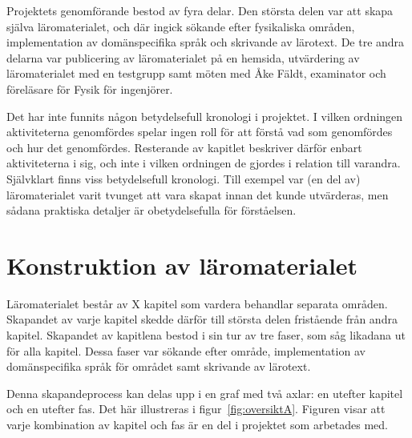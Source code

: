 \begin{draft}

Projektets genomförande bestod av fyra delar. Den största delen var att skapa själva läromaterialet, och där ingick sökande efter fysikaliska områden, implementation av domänspecifika språk och skrivande av lärotext. De tre andra delarna var publicering av läromaterialet på en hemsida, utvärdering av läromaterialet med en testgrupp samt möten med Åke Fäldt, examinator och föreläsare för Fysik för ingenjörer.

Det har inte funnits någon betydelsefull kronologi i projektet. I vilken ordningen aktiviteterna genomfördes spelar ingen roll för att förstå vad som genomfördes och hur det genomfördes. Resterande av kapitlet beskriver därför enbart aktiviteterna i sig, och inte i vilken ordningen de gjordes i relation till varandra. Självklart finns viss betydelsefull kronologi. Till exempel var (en del av) läromaterialet varit tvunget att vara skapat innan det kunde utvärderas, men sådana praktiska detaljer är obetydelsefulla för förståelsen.

\section{Konstruktion av läromaterialet}

Läromaterialet består av X kapitel som vardera behandlar separata
områden. Skapandet av varje kapitel skedde därför till största delen fristående
från andra kapitel. Skapandet av kapitlena bestod i sin tur av tre faser,
som såg likadana ut för alla kapitel. Dessa faser var sökande efter område,
implementation av domänspecifika språk för området samt skrivande av lärotext.

Denna skapandeprocess kan delas upp i en graf med två axlar: en utefter kapitel och en
utefter fas. Det här illustreras i figur~\ref{fig:oversiktA}. Figuren visar att
varje kombination av kapitel och fas är en del i projektet som arbetades med.


\end{draft}
